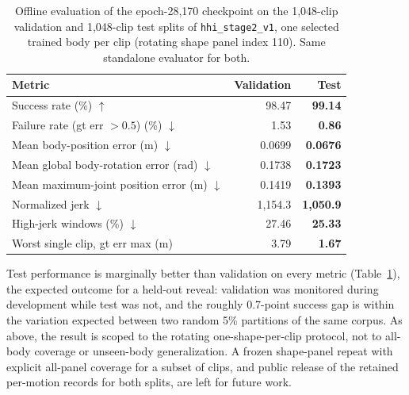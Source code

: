 \begin{table}[t]
\centering
\small
\caption{Offline evaluation of the epoch-28,170 checkpoint on the 1,048-clip
validation and 1,048-clip test splits of \texttt{hhi\_stage2\_v1}, one
selected trained body per clip (rotating shape panel index 110). Same
standalone evaluator for both.}\label{tab:test_results}
\begin{tabular}{lrr}
\toprule
Metric & Validation & Test \\
\midrule
Success rate (\%) $\uparrow$ & 98.47 & \textbf{99.14} \\
Failure rate (gt err $>0.5$) (\%) $\downarrow$ & 1.53 & \textbf{0.86} \\
Mean body-position error (m) $\downarrow$ & 0.0699 & \textbf{0.0676} \\
Mean global body-rotation error (rad) $\downarrow$ & 0.1738 & \textbf{0.1723} \\
Mean maximum-joint position error (m) $\downarrow$ & 0.1419 & \textbf{0.1393} \\
Normalized jerk $\downarrow$ & 1,154.3 & \textbf{1,050.9} \\
High-jerk windows (\%) $\downarrow$ & 27.46 & \textbf{25.33} \\
Worst single clip, gt err max (m) & 3.79 & \textbf{1.67} \\
\bottomrule
\end{tabular}
\end{table}

Test performance is marginally better than validation on every metric
(Table~\ref{tab:test_results}), the expected outcome for a held-out reveal:
validation was monitored during development while test was not, and the
roughly 0.7-point success gap is within the variation expected between two
random 5\% partitions of the same corpus. As above, the result is scoped to
the rotating one-shape-per-clip protocol, not to all-body coverage or
unseen-body generalization. A frozen shape-panel repeat with explicit
all-panel coverage for a subset of clips, and public release of the
retained per-motion records for both splits, are left for future work.


